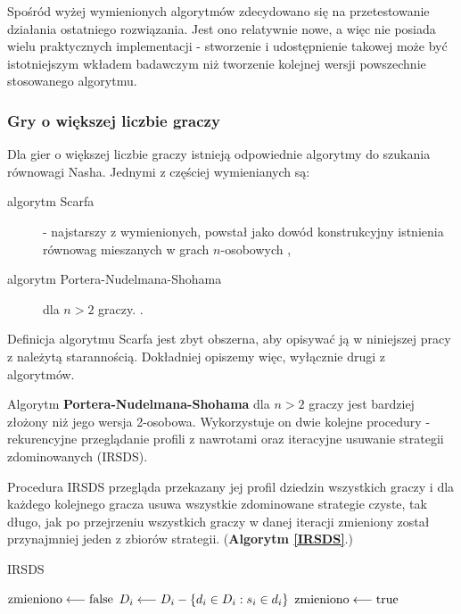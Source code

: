 \documentclass[polish]{standalone}
\begin{document}
Spośród wyżej wymienionych algorytmów zdecydowano się na przetestowanie działania ostatniego rozwiązania. Jest ono
relatywnie nowe, a więc nie posiada wielu praktycznych implementacji - stworzenie i udostępnienie takowej może być
istotniejszym wkładem badawczym niż tworzenie kolejnej wersji powszechnie stosowanego algorytmu.

\subsubsection{Gry o większej liczbie graczy}

Dla gier o większej liczbie graczy istnieją odpowiednie algorytmy do szukania równowagi Nasha. Jednymi z częściej
wymienianych są:
\begin{description}
\item[algorytm Scarfa] - najstarszy z wymienionych, powstał jako dowód konstrukcyjny istnienia równowag mieszanych
w grach $n$-osobowych \cite{SCARF-NR},
\item[algorytm Portera-Nudelmana-Shohama] dla $n > 2$ graczy. \cite{PNS-NE}.
\end{description}
Definicja algorytmu Scarfa jest zbyt obszerna, aby opisywać ją w niniejszej pracy z należytą starannością. Dokładniej
opiszemy więc, wyłącznie drugi z algorytmów.

Algorytm \textbf{Portera-Nudelmana-Shohama}\cite{PNS-NE} dla $n > 2$ graczy jest bardziej złożony niż jego wersja
2-osobowa. Wykorzystuje on dwie kolejne procedury - rekurencyjne przeglądanie profili z nawrotami oraz iteracyjne usuwanie strategii zdominowanych
(IRSDS).

Procedura IRSDS przegląda przekazany jej profil dziedzin wszystkich graczy i dla każdego kolejnego gracza usuwa
wszystkie zdominowane strategie czyste, tak długo, jak po przejrzeniu wszystkich graczy w danej iteracji zmieniony 
został przynajmniej jeden z zbiorów strategii. (\textbf{Algorytm \ref{IRSDS}}.)

\begin{algorithm}
\caption{IRSDS}
\label{IRSDS}
\begin{algorithmic}
\REPEAT
 \STATE $\textrm{zmieniono} \longleftarrow \textrm{false}$
     \STATE $D_i \longleftarrow D_i - \{ d_i \in D_i: s_i \in d_i \}$
     \STATE $\textrm{zmieniono} \longleftarrow \textrm{true}$
     \ENDIF
    \ENDIF
   \ENDFOR 
  \ENDFOR
 \ENDFOR
{}
\end{algorithmic}
\end{algorithm}
\end{document}
